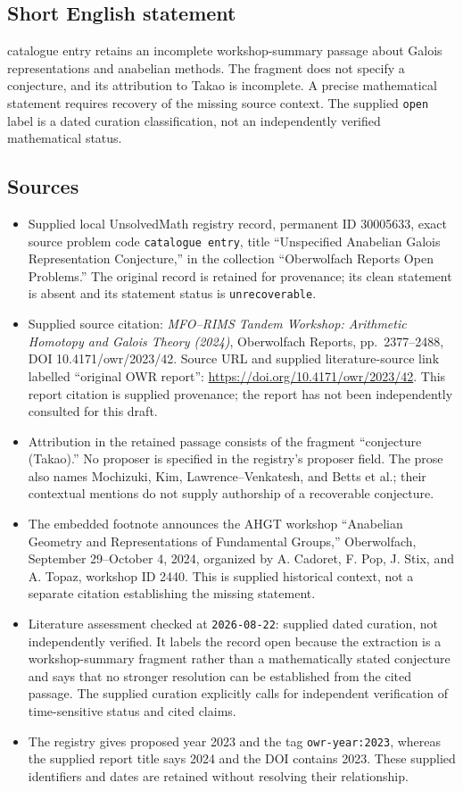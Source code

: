 \documentclass[11pt]{article}
\begin{document}
\subsection{Short English statement}
catalogue entry retains an incomplete workshop-summary passage about Galois representations and anabelian methods. The fragment does not specify a conjecture, and its attribution to Takao is incomplete. A precise mathematical statement requires recovery of the missing source context. The supplied \texttt{open} label is a dated curation classification, not an independently verified mathematical status.
\subsection{Sources}
\begin{itemize}
\item Supplied local UnsolvedMath registry record, permanent ID 30005633, exact source problem code \texttt{catalogue entry}, title ``Unspecified Anabelian Galois Representation Conjecture,'' in the collection ``Oberwolfach Reports Open Problems.'' The original record is retained for provenance; its clean statement is absent and its statement status is \texttt{unrecoverable}.
\item Supplied source citation: \emph{MFO--RIMS Tandem Workshop: Arithmetic Homotopy and Galois Theory (2024)}, Oberwolfach Reports, pp.\ 2377--2488, DOI 10.4171/owr/2023/42. Source URL and supplied literature-source link labelled ``original OWR report'': \url{https://doi.org/10.4171/owr/2023/42}. This report citation is supplied provenance; the report has not been independently consulted for this draft.
\item Attribution in the retained passage consists of the fragment ``conjecture (Takao).'' No proposer is specified in the registry's proposer field. The prose also names Mochizuki, Kim, Lawrence--Venkatesh, and Betts et al.; their contextual mentions do not supply authorship of a recoverable conjecture.
\item The embedded footnote announces the AHGT workshop ``Anabelian Geometry and Representations of Fundamental Groups,'' Oberwolfach, September 29--October 4, 2024, organized by A. Cadoret, F. Pop, J. Stix, and A. Topaz, workshop ID 2440. This is supplied historical context, not a separate citation establishing the missing statement.
\item Literature assessment checked at \texttt{2026-08-22}: supplied dated curation, not independently verified. It labels the record open because the extraction is a workshop-summary fragment rather than a mathematically stated conjecture and says that no stronger resolution can be established from the cited passage. The supplied curation explicitly calls for independent verification of time-sensitive status and cited claims.
\item The registry gives proposed year 2023 and the tag \texttt{owr-year:2023}, whereas the supplied report title says 2024 and the DOI contains 2023. These supplied identifiers and dates are retained without resolving their relationship.
\end{itemize}
\end{document}
